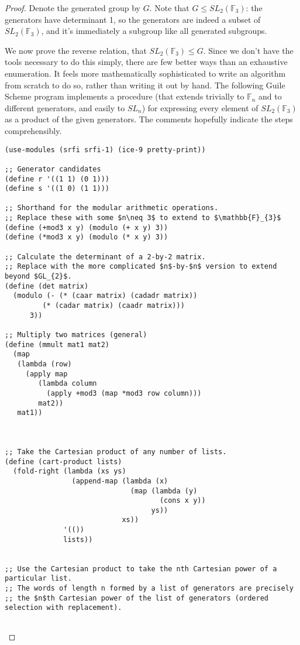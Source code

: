 \documentclass{article}
\begin{document}
\begin{proof}
  Denote the generated group by $G$.
  Note that $G\leq SL_{2}(\mathbb{F}_{3})$: the generators have determinant 1, so the generators are indeed a subset of $SL_{2}(\mathbb{F}_{3})$,
  and it's immediately a subgroup like all generated subgroups.

  We now prove the reverse relation, that $SL_{2}(\mathbb{F}_{3})\leq G$.
  Since we don't have the tools necessary to do this simply, there are few better ways than an exhaustive enumeration.
  It feels more mathematically sophisticated to write an algorithm from scratch to do so, rather than writing it out by hand.
  The following Guile Scheme program implements a procedure
  (that extends trivially to $\mathbb{F}_{n}$ and to different generators, and easily to $SL_{n}$)
  for expressing every element of $SL_{2}(\mathbb{F}_{3})$ as a product of the given generators.
  The comments hopefully indicate the steps comprehensibly.
\begin{verbatim}
(use-modules (srfi srfi-1) (ice-9 pretty-print))

;; Generator candidates
(define r '((1 1) (0 1)))
(define s '((1 0) (1 1)))

;; Shorthand for the modular arithmetic operations.
;; Replace these with some $n\neq 3$ to extend to $\mathbb{F}_{3}$
(define (+mod3 x y) (modulo (+ x y) 3))
(define (*mod3 x y) (modulo (* x y) 3))

;; Calculate the determinant of a 2-by-2 matrix.
;; Replace with the more complicated $n$-by-$n$ version to extend beyond $GL_{2}$.
(define (det matrix)
  (modulo (- (* (caar matrix) (cadadr matrix))
	     (* (cadar matrix) (caadr matrix)))
	  3))

;; Multiply two matrices (general)
(define (mmult mat1 mat2)
  (map
   (lambda (row)
     (apply map
	    (lambda column
	      (apply +mod3 (map *mod3 row column)))
	    mat2))
   mat1))



;; Take the Cartesian product of any number of lists.
(define (cart-product lists)
  (fold-right (lambda (xs ys)
                (append-map (lambda (x)
                              (map (lambda (y)
                                     (cons x y))
                                   ys))
                            xs))
              '(())
              lists))


;; Use the Cartesian product to take the nth Cartesian power of a particular list.
;; The words of length n formed by a list of generators are precisely
;; the $n$th Cartesian power of the list of generators (ordered selection with replacement).


\end{verbatim}
\end{proof}
\end{document}
